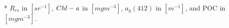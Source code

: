 \documentclass[preview]{standalone}
\begin{document}
\begin{threeparttable}
\begin{tabular}{cccccccccc}
\end{tabular}
\begin{tablenotes}\tiny
\item [*] $R_{rs}$ in $[sr^{-1}]$, $Chl-\it{a}$ in $[mg m^{-3}]$, $a_{g}(412)$ in $[m^{-1}]$, and POC in $[mg m^{-3}]$.
\end{tablenotes}
\end{threeparttable}
\end{document}
